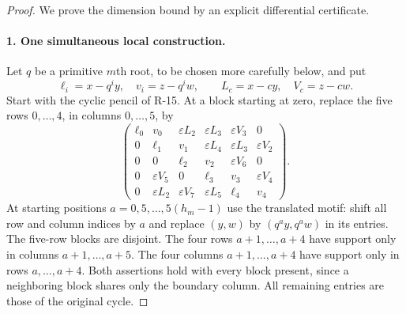 \begin{proof}
We prove the dimension bound by an explicit differential certificate.

\paragraph{1. One simultaneous local construction.}
Let $q$ be a primitive $m$th root, to be chosen more carefully below,
and put
\[
 \ell_i=x-q^iy,\quad v_i=z-q^iw,\qquad
 L_c=x-cy,\quad V_c=z-cw.
\]
Start with the cyclic pencil of R-15. At a block starting at zero,
replace the five rows $0,\ldots,4$, in columns $0,\ldots,5$, by
\begin{equation}\label{R20:motif}
 \begin{pmatrix}
 \ell_0&v_0&\varepsilon L_2&\varepsilon L_3&\varepsilon V_3&0\\
 0&\ell_1&v_1&\varepsilon L_4&\varepsilon L_3&\varepsilon V_2\\
 0&0&\ell_2&v_2&\varepsilon V_6&0\\
 0&\varepsilon V_5&0&\ell_3&v_3&\varepsilon V_4\\
 0&\varepsilon L_2&\varepsilon V_7&\varepsilon L_5&\ell_4&v_4
 \end{pmatrix}.
\end{equation}
At starting positions $a=0,5,\ldots,5(h_m-1)$ use the translated
motif: shift all row and column indices by $a$ and replace
$(y,w)$ by $(q^ay,q^aw)$ in its entries. The five-row blocks are
disjoint. The four rows $a+1,\ldots,a+4$ have support only in
columns $a+1,\ldots,a+5$. The four columns
$a+1,\ldots,a+4$ have support only in rows $a,\ldots,a+4$.
Both assertions hold with every block present, since a neighboring
block shares only the boundary column. All remaining entries are
those of the original cycle.


\end{proof}
